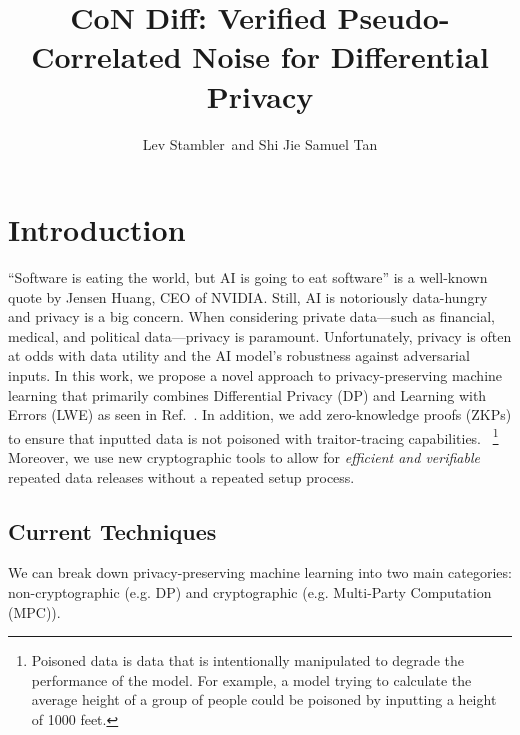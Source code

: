 \documentclass[11pt]{article}
\newcommand{\myname}{Lev Stambler}
\begin{document}
\title{CoN Diff: Verified Pseudo-Correlated Noise for Differential Privacy}

\author{\myname\ and Shi Jie Samuel Tan}

\date{}
\maketitle




\section{Introduction}
    ``Software is eating the world, but AI is going to eat software'' is a well-known quote by Jensen Huang, CEO of NVIDIA.
    Still, AI is notoriously data-hungry and privacy is a big concern.
    When considering private data---such as financial, medical, and political data---privacy is paramount.
    Unfortunately, privacy is often at odds with data utility and the AI model's robustness against adversarial inputs.
    In this work, we propose a novel approach to privacy-preserving machine learning that primarily combines Differential Privacy (DP) and Learning with Errors (LWE) as seen in Ref.~\cite{stevens2021efficientdifferentiallyprivatesecure}.
    In addition, we add zero-knowledge proofs (ZKPs) to ensure that inputted data is not poisoned with traitor-tracing capabilities.
    ~\footnote{Poisoned data is data that is intentionally manipulated to degrade the performance of the model.
    For example, a model trying to calculate the average height of a group of people could be poisoned by inputting a height of 1000 feet.}
    Moreover, we use new cryptographic tools to allow for \emph{efficient and verifiable} repeated data releases without a repeated setup process.

\subsection{Current Techniques}
We can break down privacy-preserving machine learning into two main categories: non-cryptographic (e.g. DP) and cryptographic (e.g. Multi-Party Computation (MPC)).
\end{document}
